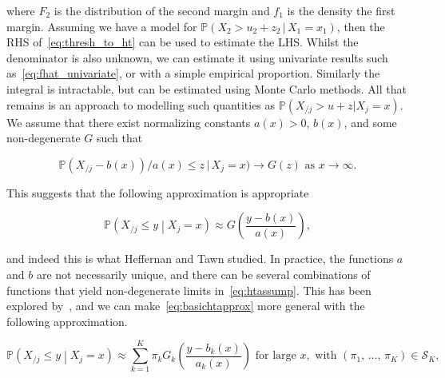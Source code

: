 \documentclass[11pt,twoside,openany]{book}
\newcommand{\prob}{\mathbb{P}}
\newcommand{\ra}{\rightarrow}
\numberwithin{Theorem}{chapter}
\numberwithin{Definition}{chapter}
\numberwithin{Lemma}{chapter}
\numberwithin{Algorithm}{chapter}
\numberwithin{equation}{chapter}
\begin{document}
where $F_2$ is the distribution of the second margin and $f_1$ is the density
the first margin. Assuming we have a model for $\prob(X_2 > u_2 + z_2\, |\, X_1 = x_1)$, then the
RHS of~\eqref{eq:thresh_to_ht} can be used to estimate the LHS. Whilst
the denominator is also unknown, we can estimate it
using univariate results such as~\eqref{eq:fhat_univariate}, or with a simple
empirical proportion. Similarly
the integral is intractable, but can be estimated using Monte Carlo methods.
All that remains is an approach to modelling such quantities as
$\prob(X_{/j}> u + z |X_j = x)$. We assume that there exist
normalizing constants $a(x)>0$, $b(x)$, and some non-degenerate $G$ such that

\begin{equation}
  \label{eq:htassump}
  \prob(X_{/j} - b(x))/a(x)\leq z \,|\,X_j = x)\rightarrow G(z) \text{ as } {x\rightarrow\infty}.
\end{equation}

This suggests that the following approximation is appropriate

\begin{equation}
  \label{eq:basichtapprox}
\prob\left(X_{/j}\leq y\middle| X_{j} = x\right)\approx
G\left(\frac{y - b(x)}{a(x)}\right),
\end{equation}

and indeed this is what Heffernan and Tawn
studied. In practice,
the functions $a$ and $b$ are not necessarily unique, and there can
be several combinations of functions that yield non-degenerate limits in~\eqref{eq:htassump}.
This has been explored
by~\cite{tendijck2021modeling}, and
we can make~\eqref{eq:basichtapprox} more general with the following approximation.





\begin{equation}\label{eq:modalhtapprox}
  \prob\left(X_{/j}\leq y\middle| X_{j} = x\right)
  \approx \sum_{k=1}^K \pi_k G_k\left(\frac{y - b_k(x)}{a_k(x)}\right)
\text{ for large }x,
\text{ with }(\pi_1,\,\ldots,\,\pi_K)\in \mathcal{S}_{K},
\end{equation}
\end{document}
